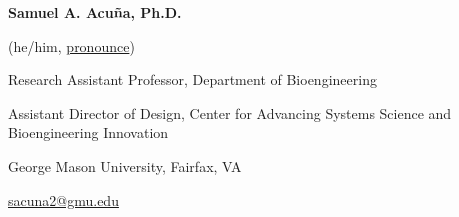 \documentclass[letterpaper, 10pt]{article}
\begin{document}
% 

\begin{center}
{\LARGE \textbf{Samuel A. Acuña, Ph.D.}}
\end{center}
\hspace{0.5in} {\footnotesize (he/him, \href{https://namedrop.io/samuelacuna}{pronounce})}

\hspace{0.5in} Research Assistant Professor, Department of Bioengineering

\hspace{0.5in} Assistant Director of Design, Center for Advancing Systems Science and Bioengineering Innovation

\hspace{0.5in} George Mason University, Fairfax, VA

\hspace{0.5in} \href{mailto:sacuna2@gmu.edu}{sacuna2@gmu.edu}



\end{document}
